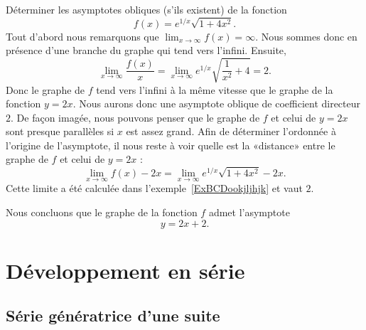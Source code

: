 \begin{example}
    Déterminer les asymptotes obliques (s'ils existent) de la fonction
    \begin{equation}
        f(x)= e^{1/x}\sqrt{1+4x^2}.
    \end{equation}
    Tout d'abord nous remarquons que \( \lim_{x\to \infty} f(x)=\infty\). Nous sommes donc en présence d'une branche du graphe qui tend vers l'infini. Ensuite,
    \begin{equation}
        \lim_{x\to \infty} \frac{ f(x) }{ x }=\lim_{x\to \infty}  e^{1/x}\sqrt{\frac{1}{ x^2 }+4}=2.
    \end{equation}
    Donc le graphe de \( f\) tend vers l'infini à la même vitesse que le graphe de la fonction \( y=2x\). Nous aurons donc une asymptote oblique de coefficient directeur \( 2\). De façon imagée, nous pouvons penser que le graphe de \( f\) et celui de \( y=2x\) sont presque parallèles si \( x\) est assez grand. Afin de déterminer l'ordonnée à l'origine de l'asymptote, il nous reste à voir quelle est la «distance» entre le graphe de \( f\) et celui de \( y=2x\) :
    \begin{equation}
        \lim_{x\to \infty} f(x)-2x=\lim_{x\to \infty}  e^{1/x}\sqrt{1+4x^2}-2x.
    \end{equation}
    Cette limite a été calculée dans l'exemple~\ref{ExBCDookjljhjk} et vaut $2$.

	Nous concluons que le graphe de la fonction $f$ admet l'asymptote
    \begin{equation}
	y=2x+2.
    \end{equation}
\end{example}

\section{Développement en série}

\subsection{Série génératrice d'une suite}

